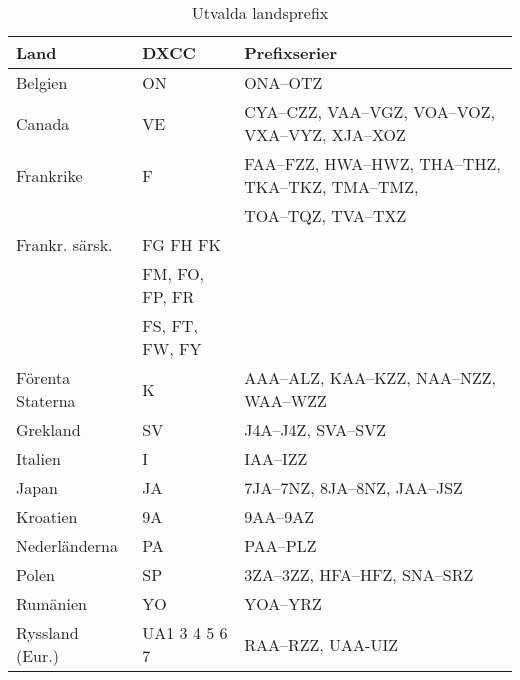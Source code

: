 \begin{center}
  \begin{footnotesize}
    \begin{longtable}{lll}
      \caption{Utvalda landsprefix} \\
      \textbf{Land}                 & \textbf{DXCC}  & \textbf{Prefixserier}                             \\ \hline
			Belgien                       & ON             & ONA--OTZ                                          \\
			Canada                        & VE             & CYA--CZZ, VAA--VGZ, VOA--VOZ, VXA--VYZ, XJA--XOZ  \\
			Frankrike                     & F              & FAA--FZZ, HWA--HWZ, THA--THZ, TKA--TKZ, TMA--TMZ, \\
			                              &                & TOA--TQZ, TVA--TXZ                                \\
			Frankr. särsk.                & FG FH FK       &                                                   \\
			                              & FM, FO, FP, FR &                                                   \\
			                              & FS, FT, FW, FY &                                                   \\
			Förenta Staterna              & K              & AAA--ALZ, KAA--KZZ, NAA--NZZ, WAA--WZZ            \\
			Grekland                      & SV             & J4A--J4Z, SVA--SVZ                                \\
			Italien                       & I              & IAA--IZZ                                          \\
			Japan                         & JA             & 7JA--7NZ, 8JA--8NZ, JAA--JSZ                      \\
			Kroatien                      & 9A             & 9AA--9AZ                                          \\
			Nederländerna                 & PA             & PAA--PLZ                                          \\
			Polen                         & SP             & 3ZA--3ZZ, HFA--HFZ, SNA--SRZ                      \\
			Rumänien                      & YO             & YOA--YRZ                                          \\
			Ryssland (Eur.)               & UA1 3 4 5 6 7  & RAA--RZZ, UAA-UIZ                                 \\

\end{longtable}
\end{footnotesize}
\end{center}
